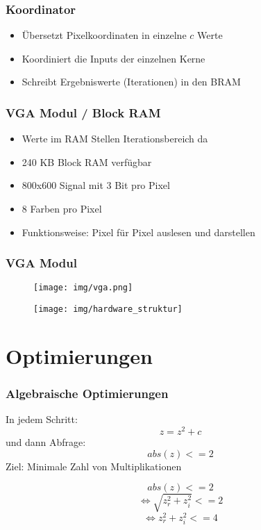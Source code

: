 \documentclass{beamer}
\begin{document}
\begin{frame}
    \frametitle{Koordinator}
    \begin{itemize}
        \item Übersetzt Pixelkoordinaten in einzelne $c$ Werte
        \item Koordiniert die Inputs der einzelnen Kerne
        \item Schreibt Ergebniswerte (Iterationen) in den BRAM
    \end{itemize}
\end{frame}

\begin{frame}
    \frametitle{VGA Modul / Block RAM}
    \begin{itemize}
        \item Werte im RAM Stellen Iterationsbereich da
        \item 240 KB Block RAM verfügbar
        \item 800x600 Signal mit 3 Bit pro Pixel
        \item 8 Farben pro Pixel
        \item Funktionsweise: Pixel für Pixel auslesen und darstellen
    \end{itemize}
\end{frame}

\begin{frame}
    \frametitle{VGA Modul}
    \begin{figure}
        \texttt{[image: img/vga.png]}
    \end{figure}
\end{frame}

\begin{frame}
    \begin{figure}
        \texttt{[image: img/hardware\_struktur]}
    \end{figure}
\end{frame}

\section{Optimierungen}
\begin{frame}
    \frametitle{Algebraische Optimierungen}
    In jedem Schritt:
    \[z = z^2 + c\]
    und dann Abfrage:
    \[abs(z) <= 2\]
    \color{red}Ziel: \color{black} Minimale Zahl von Multiplikationen
\end{frame}

\begin{frame}
    \[abs(z) <= 2\]
    \[\Leftrightarrow\sqrt{z_r^2 + z_i^2} <= 2\]
    \[\Leftrightarrow z_r^2 + z_i^2 <= 4\]
\end{frame}
\end{document}
